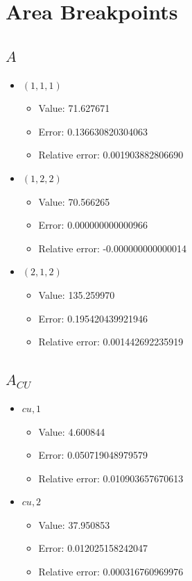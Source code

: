 \documentclass{article}%
\begin{document}
\section{Area Breakpoints}%
\thispagestyle{plain}%
\subsection{$A$}%
\begin{itemize}%
	\item $(1, 1, 1)$%
	\begin{itemize}%
		\item Value: 71.627671%
		\item Error: 0.136630820304063%
		\item Relative error: 0.001903882806690%
	\end{itemize}%
	\item $(1, 2, 2)$%
	\begin{itemize}%
		\item Value: 70.566265%
		\item Error: 0.000000000000966%
		\item Relative error: -0.000000000000014%
	\end{itemize}%
	\item $(2, 1, 2)$%
	\begin{itemize}%
		\item Value: 135.259970%
		\item Error: 0.195420439921946%
		\item Relative error: 0.001442692235919%
	\end{itemize}%
\end{itemize}%
\subsection{$A_{CU}$}%
\begin{itemize}%
	\item $\textit{cu},1$%
	\begin{itemize}%
		\item Value: 4.600844%
		\item Error: 0.050719048979579%
		\item Relative error: 0.010903657670613%
	\end{itemize}%
	\item $\textit{cu},2$%
	\begin{itemize}%
		\item Value: 37.950853%
		\item Error: 0.012025158242047%
		\item Relative error: 0.000316760969976%
	\end{itemize}%
\end{itemize}%
\end{document}
